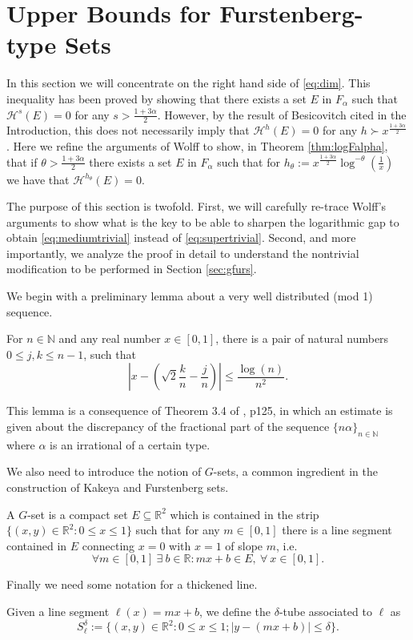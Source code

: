 \documentclass[11pt,a4paper]{amsart}
\begin{document}
\section{Upper Bounds for Furstenberg-type Sets}\label{sec:furs}
In this section we will concentrate on the right hand side of \eqref{eq:dim}.  This inequality has been proved by showing that there exists a set $E$
 in $F_{\alpha}$ such that  ${\mathcal{H}^{{s}}}(E)=0$
for any $s>\frac{1+3\alpha}{2}$.
However, by the result of Besicovitch cited in the Introduction, this does not necessarily imply that 
${\mathcal{H}^{{h}}}(E)=0$ for any $h\succ x^\frac{1+3\alpha}{2}$.
Here we refine the arguments of Wolff to show, in Theorem \ref{thm:logFalpha}, that if $\theta > \frac{1+3\alpha}{2}$ there exists a set $E$ in $F_{\alpha}$ such that for $h_{\theta} := x^{\frac{1+3\alpha}{2}}\log^{-\theta}\left(\frac{1}{x}\right)$ we have that
${\mathcal{H}^{{h_\theta}}}(E) = 0$.  

The purpose of this section is twofold. First,  we will carefully re-trace Wolff's arguments to show what is the key to be able to sharpen the logarithmic gap to obtain \eqref{eq:mediumtrivial} instead of \eqref{eq:supertrivial}. Second, and more importantly, we analyze the proof in detail to understand the nontrivial modification to be performed in Section \ref{sec:gfurs}.

We begin with a preliminary lemma about a very well distributed (mod 1) sequence.

\begin{lemma}\label{lem:discre}
 For $n\in {\mathbb{N}}$ and any real number $x\in [0,1]$, there is a pair of natural numbers $0\le j,k\le n-1$, such that
\begin{equation*}
\left|x-\left(\sqrt{2}\frac{k}{n}-\frac{j}{n}\right)\right|\le\frac{\log(n)}{n^2}.
\end{equation*}
\end{lemma}
This lemma is a consequence of Theorem 3.4 of \cite{kn74}, p125, in which an estimate is given about the discrepancy of the
fractional part of the sequence $\{n\alpha\}_{n\in{\mathbb{N}}}$ where $\alpha$ is an irrational of a certain type.

We also need to introduce the notion of $G$-sets, a common ingredient in the construction of Kakeya and Furstenberg sets.

\begin{definition}
 A $G$-set is a compact set $E{\subseteq}{\mathbb{R}}^2$ which is contained in the strip $\{(x,y)\in{\mathbb{R}}^2:0\le x \le 1\}$ such that for any $m\in[0,1]$ there is a line segment contained in $E$ connecting $x=0$ with $x=1$ of slope $m$, i.e.
\[
\forall m\in[0,1]\ \exists \ b\in{\mathbb{R}}: mx+b\in E,\ \forall \ x\in
[0,1].
\]
\end{definition}
Finally we need some notation for a thickened line.
\begin{definition}
 Given a line segment $\ell(x)=mx+b$, we define the $\delta$-tube associated to $\ell$ as
\[
S_\ell^\delta:=\{(x,y)\in{\mathbb{R}}^2:0\le x\le 1; |y-(mx+b)|\le\delta\}.
\]
\end{definition}
\end{document}
